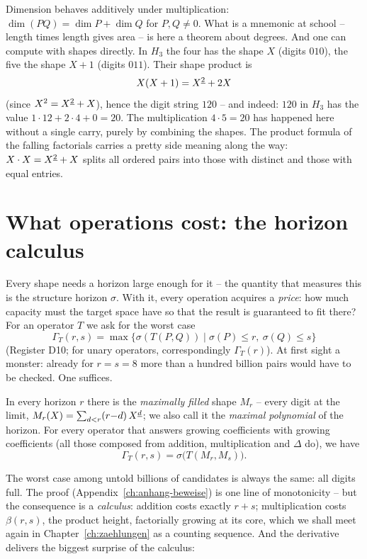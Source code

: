 Dimension behaves additively under multiplication:
$\dim(PQ)=\dim P+\dim Q$ for $P,Q\ne0$. What is a mnemonic at school --
length times length gives area -- is here a theorem about degrees.
And one can compute with shapes directly. In $H_3$ the four has
the shape $X$ (digits $010$), the five the shape $X+1$ (digits
$011$). Their shape product is
\[
X(X+1)=X^{\underline{2}}+2X
\]
(since $X^2=X^{\underline{2}}+X$), hence the digit string $120$ -- and
indeed: $120$ in $H_3$ has the value $1\cdot12+2\cdot4+0=20$.
The multiplication $4\cdot5=20$ has happened here without a single
carry, purely by combining the shapes. The product formula of the
falling factorials carries a pretty side meaning along the way:
$X\cdot X=X^{\underline{2}}+X$ splits all ordered pairs into those with
distinct and those with equal entries.

\section{What operations cost: the horizon calculus}
\label{sec:horizontkalkuel}

Every shape needs a horizon large enough for it -- the quantity
that measures this is the structure horizon $\sigma$. With it,
every operation acquires a \emph{price}: how much capacity must
the target space have so that the result is guaranteed to fit
there? For an operator $T$ we ask for the worst case
\[
\Gamma_T(r,s)=\max\{\sigma(T(P,Q)) \mid \sigma(P)\le r,\ \sigma(Q)\le s\}
\]
(Register D10; for unary operators, correspondingly
$\Gamma_T(r)$). At first sight a monster: already for $r=s=8$ more
than a hundred billion pairs would have to be checked. One
suffices.

\begin{satz}
In every horizon $r$ there is the \emph{maximally filled} shape
$M_r$ -- every digit at the limit,
$M_r(X)=\sum_{d<r}(r{-}d)\,X^{\underline{d}}$; we also call it the
\emph{maximal polynomial} of the horizon.
For every operator that answers growing coefficients with growing
coefficients (all those composed from addition, multiplication
and $\Delta$ do), we have
\[
\Gamma_T(r,s)=\sigma\bigl(T(M_r,M_s)\bigr).
\]
\end{satz}

The worst case among untold billions of candidates is always the
same: all digits full. The proof (Appendix~\ref{ch:anhang-beweise})
is one line of monotonicity -- but the consequence is a
\emph{calculus}: addition costs exactly $r+s$; multiplication costs
$\beta(r,s)$, the product height, factorially growing at its core,
which we shall meet again in Chapter~\ref{ch:zaehlungen} as a
counting sequence. And the derivative delivers the biggest
surprise of the calculus:

